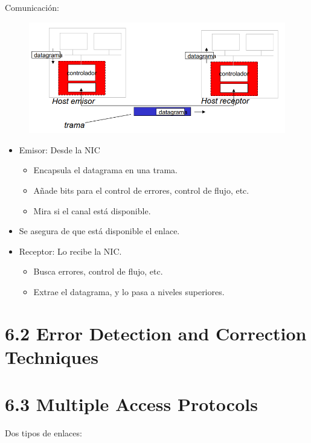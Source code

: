 \documentclass[12pt, twoside, openright]{report} %
\begin{document}
    Comunicación:
    \begin{figure}[H]
      {\includegraphics[scale=.35]{Untitled 47.png}}
    \end{figure}
    \begin{itemize}
    \item
      Emisor: Desde la NIC

      \begin{itemize}
      \item
        Encapsula el datagrama en una trama.
      \item
        Añade bits para el control de errores, control de flujo, etc.
      \item
        Mira si el canal está disponible.
      \end{itemize}
    \item
      Se asegura de que está disponible el enlace.
    \item
      Receptor: Lo recibe la NIC.

      \begin{itemize}
      \item
        Busca errores, control de flujo, etc.
      \item
        Extrae el datagrama, y lo pasa a niveles superiores.
      \end{itemize}
    \end{itemize}

    
\section{6.2 Error Detection and Correction Techniques}
\pagebreak
\section{6.3 Multiple Access Protocols}

  
    Dos tipos de enlaces:
\end{document}
